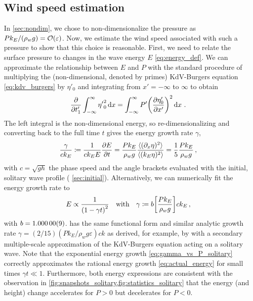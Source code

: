 \documentclass{jfm}
\renewcommand*{\epsilon}{\varepsilon}
\begin{document}
\subsection{\label{sec:press_mag} Wind speed estimation}
In \cref{sec:nondim}, we chose to non-dimensionalize the pressure as $P
k_E/(\rho_w g) = \order{\epsilon}$.
Now, we estimate the wind speed associated with such a pressure
to show that this choice is reasonable.
First, we need to relate the surface pressure to changes in the wave
energy $E$ \cref{eq:energy_def}.
We can approximate the relationship between $E$ and $P$ with the
standard procedure \citep[\eg][]{mei2005nonlinear} of multiplying the
(non-dimensional, denoted by primes) KdV-Burgers equation
\cref{eq:kdv_burgers} by $\eta'_0$ and integrating from $x'=-\infty$ to
$\infty$ to obtain
\begin{equation}
  \pdv{t'_1} \int_{-\infty}^{\infty} {\eta'}_0^2 \dd{x}
  = \int_{-\infty}^{\infty} P' \pqty{\pdv{\eta'_0}{x'}}^2
  \dd{x} \,.
\end{equation}
The left integral is the non-dimensional energy, so re-dimensionalizing
and converting back to the full time $t$ gives the energy growth rate
$\gamma$,
\begin{equation}
  \frac{\gamma}{c k_E} \coloneqq
  \frac{1}{c k_E E} \pdv{E}{t}
  = \frac{P k_E}{\rho_w g} \frac{\langle (\partial_x \eta)^2 \rangle}
    {\langle (k_E \eta)^2 \rangle}
  = \frac{1}{5} \frac{P k_E}{\rho_w g}
  \,,
  \label{eq:gamma_vs_P_solitary}
\end{equation}
with $c = \sqrt{gh}$ the phase speed and the angle brackets evaluated
with the initial, solitary wave profile (\cf{} \cref{sec:initial}).
Alternatively, we can numerically fit the energy growth rate to
\begin{equation}
  E \propto \frac{1}{\pqty{1 - \gamma t}^2}
  \qq{with}
  \gamma \coloneqq b \bqty{\frac{P k_E}{\rho_w g}} c k_E
  \,,
  \label{eq:actual_energy}
\end{equation}
with $b = \num{1.00000 \pm 0.00009}$.
 has the same functional form and similar
analytic growth rate $\gamma = (2/15) (P k_E/\rho_w g \epsilon) ck$ as
derived, for example, by \citet{zdyrski2019effects} with a secondary
multiple-scale approximation of the KdV-Burgers equation acting on a
solitary wave.
Note that the exponential energy growth \cref{eq:gamma_vs_P_solitary}
correctly approximates the rational energy growth
\cref{eq:actual_energy} for small times $\gamma t \ll 1$.
Furthermore, both energy expressions are consistent with the observation
in \cref{fig:snapshots_solitary,fig:statistics_solitary} that the energy
(and height) change accelerates for $P>0$ but decelerates for $P<0$.
\end{document}
